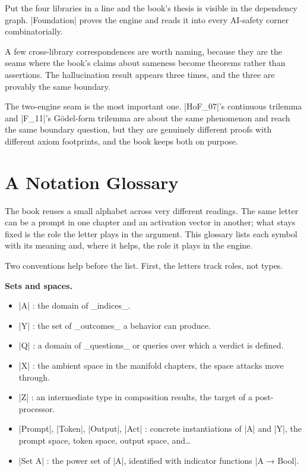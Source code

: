 \documentclass{memoir}
\begin{document}
Put the four libraries in a line and the book's thesis is visible in the dependency
graph. \LeanVerb|Foundation| proves the engine and reads it into every AI-safety corner
combinatorially.

A few cross-library correspondences are worth naming, because they are the seams
where the book's claims about sameness become theorems rather than assertions. The
hallucination result appears three times, and the three are provably the same
boundary.

The two-engine seam is the most important one. \LeanVerb|HoF_07|'s continuous trilemma and
\LeanVerb|F_11|'s Gödel-form trilemma are about the same phenomenon and reach the same
boundary question, but they are genuinely different proofs with different axiom
footprints, and the book keeps both on purpose.



\section{A Notation Glossary}\label{Two--Schemas--of--Impossibility-005F-005F-005F--Machine--Checked--Limits--of--Trustworthy--Machine--Learning-005F-005F-005F--and--Why--They--Tighten--with--Capability----Appendices----A--Notation--Glossary}

The book reuses a small alphabet across very different readings. The same letter can
be a prompt in one chapter and an activation vector in another; what stays fixed is
the role the letter plays in the argument. This glossary lists each symbol with its
meaning and, where it helps, the role it plays in the engine.

Two conventions help before the list. First, the letters track roles, not types.

\textbf{Sets and spaces.}

\begin{itemize}
\item \LeanVerb|A| : the domain of \_indices\_.
\item \LeanVerb|Y| : the set of \_outcomes\_ a behavior can produce.
\item \LeanVerb|Q| : a domain of \_questions\_ or queries over which a verdict is defined.
\item \LeanVerb|X| : the ambient space in the manifold chapters, the space attacks move through.
\item \LeanVerb|Z| : an intermediate type in composition results, the target of a
   post-processor.
\item \LeanVerb|Prompt|, \LeanVerb|Token|, \LeanVerb|Output|, \LeanVerb|Act| : concrete instantiations of \LeanVerb|A| and \LeanVerb|Y|, the
   prompt space, token space, output space, and…
\item \LeanVerb|Set A| : the power set of \LeanVerb|A|, identified with indicator functions \LeanVerb|A → Bool|.

\end{itemize}
\end{document}
